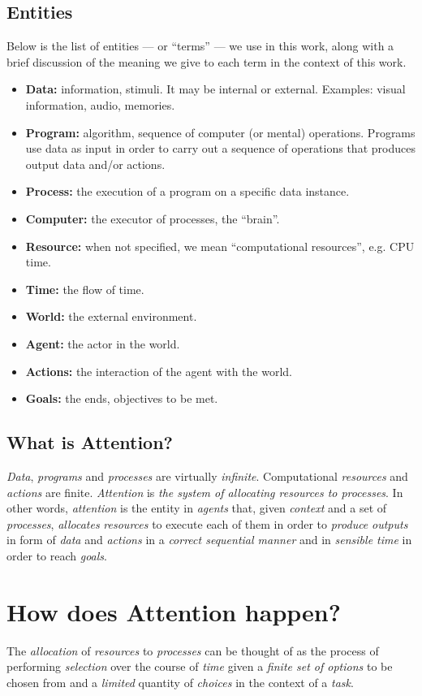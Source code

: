 \documentclass[11pt]{article}
\begin{document}
\subsection{Entities}
Below is the list of entities --- or ``terms'' --- we use in this work, along with a brief discussion of the meaning
we give to each term in the context of this work.

\begin{itemize}
    \item\textbf{Data:} information, stimuli. It may be internal or external. Examples: visual information, audio, memories.
    \item\textbf{Program:} algorithm, sequence of computer (or mental) operations. Programs use data as input in order to carry out a sequence of operations that produces output data and/or actions.
    \item\textbf{Process:} the execution of a program on a specific data instance.
    \item\textbf{Computer:} the executor of processes, the “brain”.
    \item\textbf{Resource:} when not specified, we mean “computational resources”, e.g. CPU time.
    \item\textbf{Time:} the flow of time.
    \item\textbf{World:} the external environment.
    \item\textbf{Agent:} the actor in the world.
    \item\textbf{Actions:} the interaction of the agent with the world.
    \item\textbf{Goals:} the ends, objectives to be met.
\end{itemize}

\subsection{What is Attention?}
\emph{Data}, \emph{programs} and \emph{processes} are virtually \emph{infinite}.
Computational \emph{resources} and \emph{actions} are finite.
\emph{Attention} is \emph{the system of allocating resources to processes}.
In other words, \emph{attention} is the entity in \emph{agents} that, given \emph{context} and a set of \emph{processes},
\emph{allocates} \emph{resources} to execute each of them in order to \emph{produce} \emph{outputs} in form of \emph{data} and \emph{actions} in a \emph{correct sequential manner} and in \emph{sensible time} in order to reach \emph{goals}.

\section{How does Attention happen?}\label{sec:taxonomy}
The \emph{allocation} of \emph{resources} to \emph{processes}
can be thought of as the process of
performing \emph{selection} over the course of \emph{time}
given a \emph{finite set of options} to be chosen from and a \emph{limited} quantity of \emph{choices}
in the context of a \emph{task}.
\end{document}
